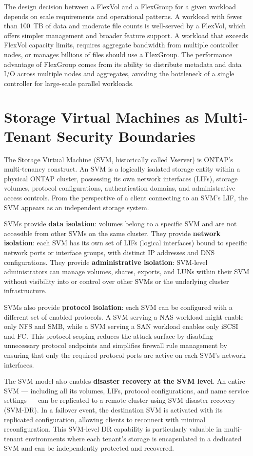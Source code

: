 The design decision between a FlexVol and a FlexGroup for a given workload depends on scale requirements and operational patterns. A workload with fewer than 100~TB of data and moderate file counts is well-served by a FlexVol, which offers simpler management and broader feature support. A workload that exceeds FlexVol capacity limits, requires aggregate bandwidth from multiple controller nodes, or manages billions of files should use a FlexGroup. The performance advantage of FlexGroup comes from its ability to distribute metadata and data I/O across multiple nodes and aggregates, avoiding the bottleneck of a single controller for large-scale parallel workloads.

\section{Storage Virtual Machines as Multi-Tenant Security Boundaries}

The Storage Virtual Machine (SVM, historically called Vserver) is ONTAP's multi-tenancy construct. An SVM is a logically isolated storage entity within a physical ONTAP cluster, possessing its own network interfaces (LIFs), storage volumes, protocol configurations, authentication domains, and administrative access controls. From the perspective of a client connecting to an SVM's LIF, the SVM appears as an independent storage system.

SVMs provide \textbf{data isolation}: volumes belong to a specific SVM and are not accessible from other SVMs on the same cluster. They provide \textbf{network isolation}: each SVM has its own set of LIFs (logical interfaces) bound to specific network ports or interface groups, with distinct IP addresses and DNS configurations. They provide \textbf{administrative isolation}: SVM-level administrators can manage volumes, shares, exports, and LUNs within their SVM without visibility into or control over other SVMs or the underlying cluster infrastructure.

SVMs also provide \textbf{protocol isolation}: each SVM can be configured with a different set of enabled protocols. A SVM serving a NAS workload might enable only NFS and SMB, while a SVM serving a SAN workload enables only iSCSI and FC. This protocol scoping reduces the attack surface by disabling unnecessary protocol endpoints and simplifies firewall rule management by ensuring that only the required protocol ports are active on each SVM's network interfaces.

The SVM model also enables \textbf{disaster recovery at the SVM level}. An entire SVM --- including all its volumes, LIFs, protocol configurations, and name service settings --- can be replicated to a remote cluster using SVM disaster recovery (SVM-DR). In a failover event, the destination SVM is activated with its replicated configuration, allowing clients to reconnect with minimal reconfiguration. This SVM-level DR capability is particularly valuable in multi-tenant environments where each tenant's storage is encapsulated in a dedicated SVM and can be independently protected and recovered.

